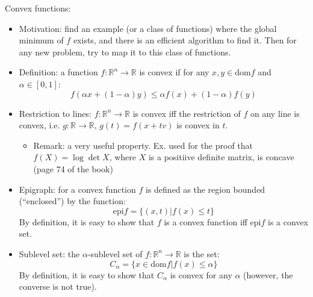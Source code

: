 \documentclass{report}
\begin{document}
Convex functions: 
\begin{itemize}
\item Motivation: find an example (or a class of functions) where the global minimum of $f$ exists, and there is an efficient algorithm to find it. Then for any new problem, try to map it to this class of functions. 

\item Definition: a function $f: \mathbb{R}^n \rightarrow \mathbb{R}$ is convex if for any $x, y \in \text{dom}f$ and $\alpha \in [0,1]$: 
\begin{equation}
f(\alpha x + (1 - \alpha) y) \leq \alpha f(x) + (1-\alpha) f(y)	
\end{equation}

\item Restriction to lines: $f: \mathbb{R}^n \rightarrow \mathbb{R}$ is convex iff the restriction of $f$ on any line is convex, i.e. $g: \mathbb{R} \rightarrow \mathbb{R}$, $g(t) = f(x + tv)$ is convex in $t$. 
\begin{itemize}
	\item Remark: a very useful property. Ex. used for the proof that $f(X) = \log \det X$, where $X$ is a positiive definite matrix, is concave (page 74 of the book)
\end{itemize}

\item Epigraph: for a convex function $f$ is defined as the region bounded (``enclosed'') by the function: 
\begin{equation}
\text{epi} f = \{ (x,t) | f(x) \leq t \}	
\end{equation}
By definition, it is easy to show that $f$ is a convex function iff $\text{epi} f$ is a convex set. 

\item Sublevel set: the $\alpha$-sublevel set of $f: \mathbb{R}^n \rightarrow \mathbb{R}$ is the set: 
\begin{equation}
C_{\alpha} = \{	x \in \text{dom} f | f(x) \leq \alpha \}
\end{equation}
By definition, it is easy to show that $C_{\alpha}$ is convex for any $\alpha$ (however, the converse is not true). 
\end{itemize}
\end{document}
